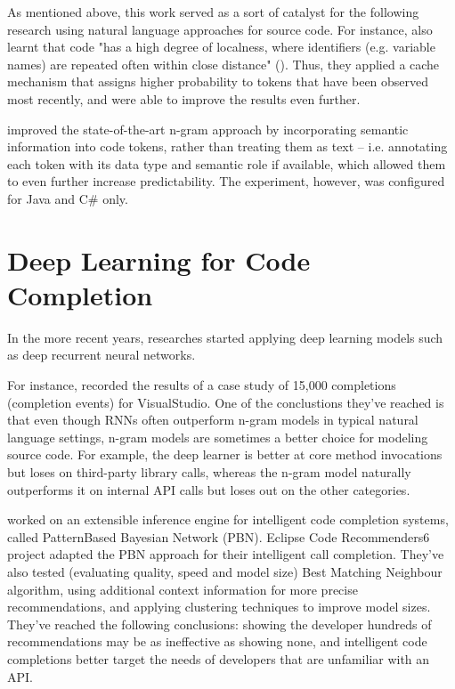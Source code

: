 As mentioned above, this work served as a sort of catalyst for the following research using natural language approaches for source code. For instance, \cite{Tu14a} also learnt that code "has a high degree of localness, where identifiers (e.g. variable names) are repeated often within close distance" (\cite{Alla18a}). Thus, they applied a cache mechanism that assigns higher probability to tokens that have been observed most recently, and were able to improve the results even further.

\cite{Nguy13a} improved the state-of-the-art n-gram approach by incorporating semantic information into code tokens, rather than treating them as text -- i.e. annotating each token with its data type and semantic role if available, which allowed them to even further increase predictability. The experiment, however, was configured for Java and C\# only.

\section{Deep Learning for Code Completion}
\label{sec:RelatedWorks-DeepLearning}
In the more recent years, researches started applying deep learning models such as deep recurrent neural networks.

For instance, \cite{Hell19a} recorded the results of a case study of 15,000 completions (completion events) for VisualStudio. One of the conclustions they've reached is that even though RNNs often outperform n-gram models in typical natural language settings, n-gram models are sometimes a better choice for modeling source code. For example, the deep learner is better at core method invocations but loses on third-party library calls, whereas the n-gram model naturally outperforms it on internal API calls but loses out on the other categories.

\cite{Prok15a} worked on an extensible inference engine for intelligent code completion systems, called PatternBased Bayesian Network (PBN). Eclipse Code Recommenders6 project adapted the PBN approach for their intelligent call completion. They've also tested (evaluating quality, speed and model size) Best Matching Neighbour algorithm, using additional context information for more precise recommendations, and applying clustering techniques to improve model sizes. They've reached the following conclusions: showing the developer hundreds of recommendations may be as ineffective as showing none, and intelligent code completions better target the needs of developers that are unfamiliar with an API.

